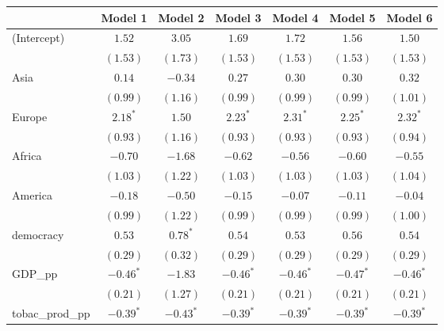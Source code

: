 
\begin{table}[!h]
\begin{center}
\begin{tabular}{l c c c c c c }
\toprule
 & Model 1 & Model 2 & Model 3 & Model 4 & Model 5 & Model 6 \\
\midrule
(Intercept)             & $1.52$       & $3.05$       & $1.69$       & $1.72$       & $1.56$       & $1.50$       \\
                        & $(1.53)$     & $(1.73)$     & $(1.53)$     & $(1.53)$     & $(1.53)$     & $(1.53)$     \\
Asia                    & $0.14$       & $-0.34$      & $0.27$       & $0.30$       & $0.30$       & $0.32$       \\
                        & $(0.99)$     & $(1.16)$     & $(0.99)$     & $(0.99)$     & $(0.99)$     & $(1.01)$     \\
Europe                  & $2.18^{*}$   & $1.50$       & $2.23^{*}$   & $2.31^{*}$   & $2.25^{*}$   & $2.32^{*}$   \\
                        & $(0.93)$     & $(1.16)$     & $(0.93)$     & $(0.93)$     & $(0.93)$     & $(0.94)$     \\
Africa                  & $-0.70$      & $-1.68$      & $-0.62$      & $-0.56$      & $-0.60$      & $-0.55$      \\
                        & $(1.03)$     & $(1.22)$     & $(1.03)$     & $(1.03)$     & $(1.03)$     & $(1.04)$     \\
America                 & $-0.18$      & $-0.50$      & $-0.15$      & $-0.07$      & $-0.11$      & $-0.04$      \\
                        & $(0.99)$     & $(1.22)$     & $(0.99)$     & $(0.99)$     & $(0.99)$     & $(1.00)$     \\
democracy               & $0.53$       & $0.78^{*}$   & $0.54$       & $0.53$       & $0.56$       & $0.54$       \\
                        & $(0.29)$     & $(0.32)$     & $(0.29)$     & $(0.29)$     & $(0.29)$     & $(0.29)$     \\
GDP\_pp                 & $-0.46^{*}$  & $-1.83$      & $-0.46^{*}$  & $-0.46^{*}$  & $-0.47^{*}$  & $-0.46^{*}$  \\
                        & $(0.21)$     & $(1.27)$     & $(0.21)$     & $(0.21)$     & $(0.21)$     & $(0.21)$     \\
tobac\_prod\_pp         & $-0.39^{*}$  & $-0.43^{*}$  & $-0.39^{*}$  & $-0.39^{*}$  & $-0.39^{*}$  & $-0.39^{*}$  \\

\end{tabular}
\end{center}
\end{table}

